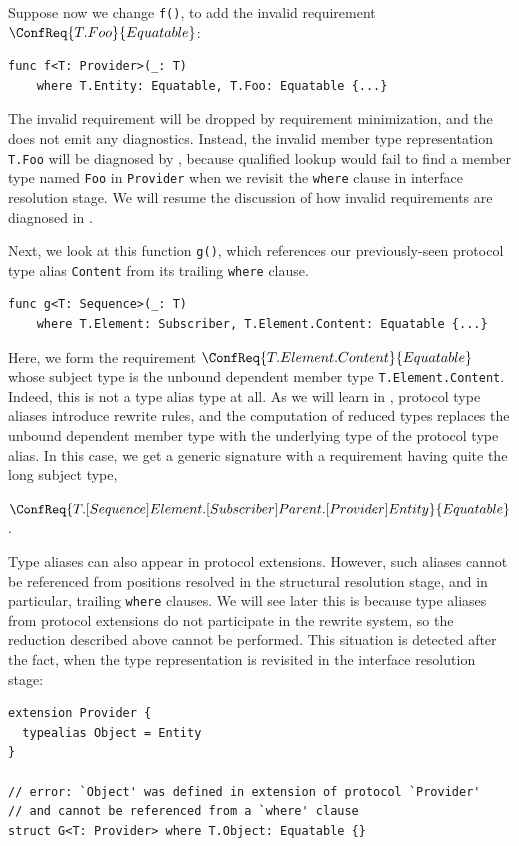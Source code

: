 \documentclass[../generics]{subfiles}
\begin{document}
Suppose now we change \texttt{f()}, to add the invalid requirement $\ConfReq{T.Foo}{Equatable}$:
\begin{Verbatim}
func f<T: Provider>(_: T)
    where T.Entity: Equatable, T.Foo: Equatable {...}
\end{Verbatim}
The invalid requirement will be dropped by requirement minimization, and the  does not emit any diagnostics. Instead, the invalid member type representation \texttt{T.Foo} will be diagnosed by , because qualified lookup would fail to find a member type named \texttt{Foo} in \texttt{Provider} when we revisit the \texttt{where} clause in interface resolution stage.  We will resume the discussion of how invalid requirements are diagnosed in .

\smallskip

Next, we look at this function \texttt{g()}, which references our previously-seen protocol type alias \texttt{Content} from its trailing \texttt{where} clause.
\begin{Verbatim}
func g<T: Sequence>(_: T)
    where T.Element: Subscriber, T.Element.Content: Equatable {...}
\end{Verbatim}
Here, we form the requirement $\ConfReq{T.Element.Content}{Equatable}$ whose subject type is the unbound dependent member type \texttt{T.Element.Content}. Indeed, this is not a type alias type at all. As we will learn in , protocol type aliases introduce rewrite rules, and the computation of reduced types replaces the unbound dependent member type with the underlying type of the protocol type alias. In this case, we get a generic signature with a requirement having quite the long subject type,
\begin{center}
$\ConfReq{T.[Sequence]Element.[Subscriber]Parent.[Provider]Entity}{Equatable}$.
\end{center}

Type aliases can also appear in protocol extensions. However, such aliases cannot be referenced from positions resolved in the structural resolution stage, and in particular, trailing \texttt{where} clauses. We will see later this is because type aliases from protocol extensions do not participate in the rewrite system, so the reduction described above cannot be performed. This situation is detected after the fact, when the type representation is revisited in the interface resolution stage:
\begin{Verbatim}
extension Provider {
  typealias Object = Entity
}

// error: `Object' was defined in extension of protocol `Provider'
// and cannot be referenced from a `where' clause
struct G<T: Provider> where T.Object: Equatable {}
\end{Verbatim}
\end{document}
